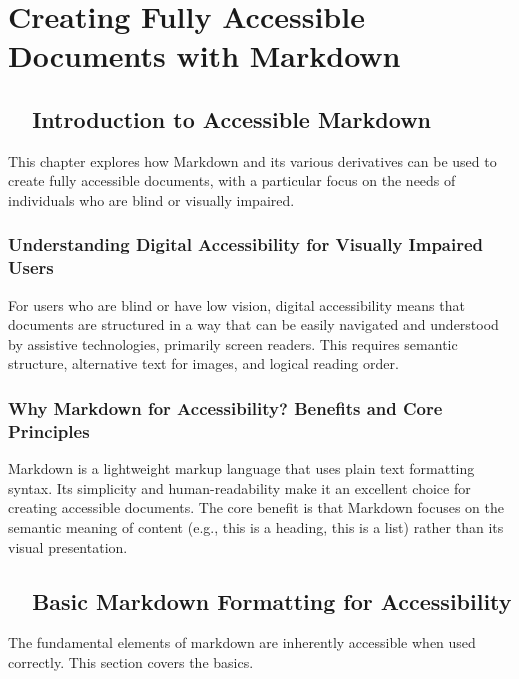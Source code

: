 \chapter{Creating Fully Accessible Documents with Markdown}
\label{chap:markdown-accessibility}

\section{~~Introduction to Accessible Markdown}
\label{sec:intro-accessible-markdown}
This chapter explores how Markdown and its various derivatives can be used to create fully accessible documents, with a particular focus on the needs of individuals who are blind or visually impaired.

\subsection{Understanding Digital Accessibility for Visually Impaired Users}
\label{subsec:digital-accessibility-vi}
For users who are blind or have low vision, digital accessibility means that documents are structured in a way that can be easily navigated and understood by assistive technologies, primarily screen readers. This requires semantic structure, alternative text for images, and logical reading order.

\subsection{Why Markdown for Accessibility? Benefits and Core Principles}
\label{subsec:why-markdown-for-accessibility}
Markdown is a lightweight markup language that uses plain text formatting syntax. Its simplicity and human-readability make it an excellent choice for creating accessible documents. The core benefit is that Markdown focuses on the semantic meaning of content (e.g., this is a heading, this is a list) rather than its visual presentation.

\section{~~Basic Markdown Formatting for Accessibility}
\label{sec:basic-markdown-formatting}
The fundamental elements of \gls{markdown} are inherently accessible when used correctly. This section covers the basics.

